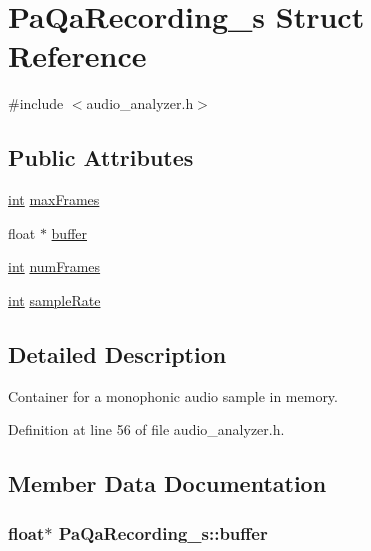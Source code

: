 \hypertarget{struct_pa_qa_recording__s}{}\section{Pa\+Qa\+Recording\+\_\+s Struct Reference}
\label{struct_pa_qa_recording__s}


{\ttfamily \#include $<$audio\+\_\+analyzer.\+h$>$}

\subsection*{Public Attributes}
\begin{DoxyCompactItemize}
\item 
\hyperlink{xmltok_8h_a5a0d4a5641ce434f1d23533f2b2e6653}{int} \hyperlink{struct_pa_qa_recording__s_abbed46e34e27ff432484f20eb6604185}{max\+Frames}
\item 
float $\ast$ \hyperlink{struct_pa_qa_recording__s_a0881fb1e483b51cd2a828ac786728f93}{buffer}
\item 
\hyperlink{xmltok_8h_a5a0d4a5641ce434f1d23533f2b2e6653}{int} \hyperlink{struct_pa_qa_recording__s_a0da5f9ac0c45a0051ce5c50cc1e05731}{num\+Frames}
\item 
\hyperlink{xmltok_8h_a5a0d4a5641ce434f1d23533f2b2e6653}{int} \hyperlink{struct_pa_qa_recording__s_a0a16e04122d6509e3efd524744b1e1df}{sample\+Rate}
\end{DoxyCompactItemize}


\subsection{Detailed Description}
Container for a monophonic audio sample in memory. 

Definition at line 56 of file audio\+\_\+analyzer.\+h.



\subsection{Member Data Documentation}
\subsubsection[{\texorpdfstring{buffer}{buffer}}]{\setlength{\rightskip}{0pt plus 5cm}float$\ast$ Pa\+Qa\+Recording\+\_\+s\+::buffer}\hypertarget{struct_pa_qa_recording__s_a0881fb1e483b51cd2a828ac786728f93}{}\label{struct_pa_qa_recording__s_a0881fb1e483b51cd2a828ac786728f93}


